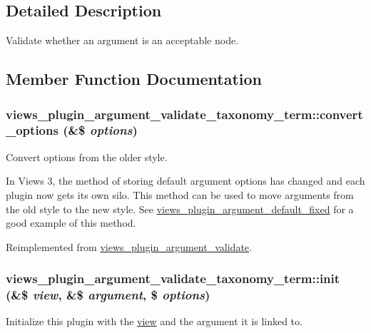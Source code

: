 \subsection{Detailed Description}
Validate whether an argument is an acceptable node. 

\subsection{Member Function Documentation}
\hypertarget{classviews__plugin__argument__validate__taxonomy__term_aa4bbbfd0ccb6a907f7fa3d2c03d504c6}{
\subsubsection[{convert\_\-options}]{\setlength{\rightskip}{0pt plus 5cm}views\_\-plugin\_\-argument\_\-validate\_\-taxonomy\_\-term::convert\_\-options (\&\$ {\em options})}}
\label{classviews__plugin__argument__validate__taxonomy__term_aa4bbbfd0ccb6a907f7fa3d2c03d504c6}
Convert options from the older style.

In Views 3, the method of storing default argument options has changed and each plugin now gets its own silo. This method can be used to move arguments from the old style to the new style. See \hyperlink{classviews__plugin__argument__default__fixed}{views\_\-plugin\_\-argument\_\-default\_\-fixed} for a good example of this method. 

Reimplemented from \hyperlink{classviews__plugin__argument__validate_a2de4a9571ea48105e195c483b13f5577}{views\_\-plugin\_\-argument\_\-validate}.\hypertarget{classviews__plugin__argument__validate__taxonomy__term_af215aeb235ee101b78ceca11f879308d}{
\subsubsection[{init}]{\setlength{\rightskip}{0pt plus 5cm}views\_\-plugin\_\-argument\_\-validate\_\-taxonomy\_\-term::init (\&\$ {\em view}, \/  \&\$ {\em argument}, \/  \$ {\em options})}}
\label{classviews__plugin__argument__validate__taxonomy__term_af215aeb235ee101b78ceca11f879308d}
Initialize this plugin with the \hyperlink{classview}{view} and the argument it is linked to. 


